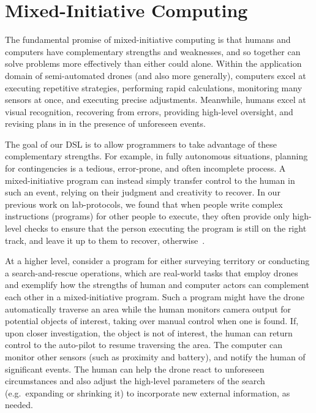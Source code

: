 \documentclass{sig-alternate-05-2015}
\begin{document}
\section{Mixed-Initiative Computing}
\label{sec:mic}

The fundamental promise of mixed-initiative computing is that humans and
computers have complementary strengths and weaknesses, and so together can
solve problems more effectively than either could alone.
%
Within the application domain of semi-automated drones (and also more
generally), computers excel at executing repetitive strategies, performing
rapid calculations, monitoring many sensors at once, and executing precise
adjustments. Meanwhile, humans excel at visual recognition, recovering from
errors, providing high-level oversight, and revising plans in in the presence
of unforeseen events.

The goal of our DSL is to allow programmers to take advantage of these
complementary strengths. For example, in fully autonomous situations, planning
for contingencies is a tedious, error-prone, and often incomplete process. A
mixed-initiative program can instead simply transfer control to the human in
such an event, relying on their judgment and creativity to recover.
%
In our previous work on lab-protocols, we found that when people write complex
instructions (programs) for other people to execute, they often provide only
high-level checks to ensure that the person executing the program is still on
the right track, and leave it up to them to recover,
otherwise~\cite{ABW15prog}.

At a higher level, consider a program for either surveying territory or
conducting a search-and-rescue operations, which are real-world tasks that
employ drones and exemplify how the strengths of human and computer actors can
complement each other in a mixed-initiative program. Such a program might have
the drone automatically traverse an area while the human monitors camera output
for potential objects of interest, taking over manual control when one is
found. If, upon closer investigation, the object is not of interest, the human
can return control to the auto-pilot to resume traversing the area. The
computer can monitor other sensors (such as proximity and battery), and notify
the human of significant events. The human can help the drone react to
unforeseen circumstances and also adjust the high-level parameters of the
search (e.g.\ expanding or shrinking it) to incorporate new external
information, as needed.
\end{document}
